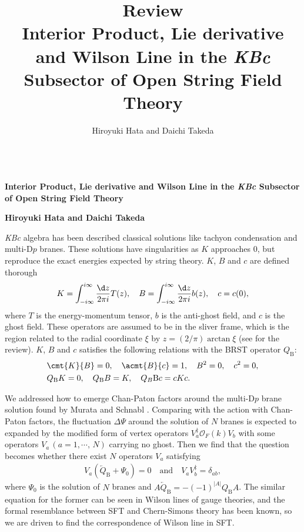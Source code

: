 \documentclass[12pt]{article}
\title{\textbf{Review}\\
Interior Product, Lie derivative and Wilson Line in the \textit{KBc} Subsector of Open String Field Theory
}
\author{Hiroyuki Hata and Daichi Takeda}
\date{}
\begin{document}
{\Large{}\\[2mm]
\textbf{Interior Product, Lie derivative and Wilson Line in the \textit{KBc} Subsector of Open String Field Theory
}
}

\noindent
\hfill\textbf{Hiroyuki Hata and Daichi Takeda}

\vspace{12pt}
\textit{KBc} algebra has been described classical solutions like tachyon condensation and multi-$\mathrm{D}p$ branes.
These solutions have singularities as $K$ approaches $0$, but reproduce the exact energies expected by string theory.
$K$, $B$ and $c$ are defined thorough
\begin{align}
	K = \int_{-i\infty}^{i\infty}\frac{\d z}{2\pi i}T(z),\quad
	B =  \int_{-i\infty}^{i\infty}\frac{\d z}{2\pi i}b(z),\quad 
	c = c(0),
\end{align}
where $T$ is the energy-momentum tensor, $b$ is the anti-ghost field, and $c$ is the ghost field.
These operators are assumed to be in the sliver frame, which is the region related to the radial coordinate $\xi$ by $z = (2/\pi)\arctan \xi$ (see \cite{Okawa:2012ica} for the review).
$K$, $B$ and $c$ satisfies the following relations with the BRST operator $Q_\mathrm{B}$:
\begin{align}
	&\cmt{K}{B} = 0,\quad
	\acmt{B}{c} = 1,\quad
	B^2 = 0,\quad
	c^2 = 0,\\
	&Q_\mathrm{B}K = 0,\quad
	Q_\mathrm{B}B = K,\quad
	Q_B\mathrm{B}c = cKc.
\end{align}

We addressed how to emerge Chan-Paton factors around the multi-$\mathrm{D}p$ brane solution found by Murata and Schnabl \cite{Murata:2011ex}.
Comparing with the action with Chan-Paton factors, the fluctuation $\Delta\Psi$ around the solution of $N$ branes is expected to expanded by the modified form of vertex operators $V_a^\ddag\mathcal O_F(k) V_b$  with some operators $V_a\,(a = 1,\cdots,\,N)$ carrying no ghost.
Then we find that the question becomes whether there exist $N$ operators $V_a$ satisfying
\begin{align}
	V_a(\overleftarrow Q_\mathrm{B}+\Psi_0) = 0\quad
	\mathrm{and}\quad 
	V_aV_b^\ddag = \delta_{ab},\label{eq:Va_coditions}
\end{align}
where $\Psi_0$ is the solution of $N$ branes and $A\overleftarrow Q_\mathrm{B} = -(-1)^{|A|}Q_\mathrm{B}A$.
The similar equation for the former can be seen in Wilson lines of gauge theories, and the formal resemblance between SFT and Chern-Simons theory has been known,
so we are driven to find the correspondence of Wilson line in SFT.
\end{document}
